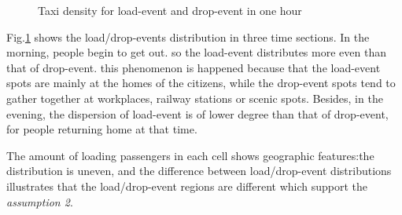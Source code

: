 \begin{figure}[!h]
\centering
\vspace{0.in}
\vspace{0.in}
\vspace{0.in}
\vspace{0.in}
\vspace{0.in}
\vspace{0.in}

\caption{Taxi density for load-event and drop-event in one hour}\label{figure_taxi_density_for_one_hour}
\end{figure}




Fig.\ref{figure_taxi_density_for_one_hour} shows the load/drop-events distribution in three time sections. In the morning, people begin to get out. so the load-event distributes more even than that of drop-event. this phenomenon is happened because that the load-event spots are mainly at the homes of the citizens, while the drop-event spots tend to gather together at workplaces, railway stations or scenic spots. Besides, in the evening, the dispersion of load-event is of lower degree than that of drop-event, for people returning home at that time.

The amount of loading passengers in each cell shows geographic features:the distribution is uneven, and the difference between load/drop-event distributions illustrates that the load/drop-event regions are different which support the \emph{assumption 2}.
